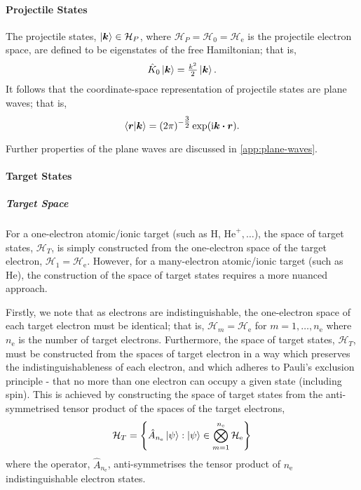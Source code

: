 \documentclass[draft]{article}
\begin{document}
\paragraph{Projectile States}
\label{sec:projectile-states}

The projectile states, $\ket{\boldsymbol{k}} \in \mathcal{H}_{P}$, where
$\mathcal{H}_{P} = \mathcal{H}_{0} = \mathcal{H}_{\mathrm{e}}$ is the projectile
electron space, are defined to be eigenstates of the free Hamiltonian; that is,
\begin{equation}
  \label{eq:projectile-hamiltonian}
  \hat{K}_{0}
  \ket{\boldsymbol{k}}
  =
  \tfrac{k^{2}}{2}
  \ket{\boldsymbol{k}}
  .
\end{equation}
It follows that the coordinate-space representation of projectile states are
plane waves; that is,
\begin{equation}
  \label{eq:projectile-states}
  \bra{\boldsymbol{r}}
  \ket{\boldsymbol{k}}
  =
  \lr{2 \pi}^{-\tfrac{3}{2}}
  \exponential\lr
  {
    \imath
    \boldsymbol{k}
    \vdot
    \boldsymbol{r}
  }
  .
\end{equation}

Further properties of the plane waves are discussed in
\autoref{app:plane-waves}.

\paragraph{Target States}
\label{sec:target-states}

\subparagraph{Target Space}
\label{sec:target-space}

For a one-electron atomic/ionic target (such as H, $\mathrm{He}^{+}, \dotsc$),
the space of target states, $\mathcal{H}_{T}$, is simply constructed from the
one-electron space of the target electron,
$\mathcal{H}_{1} = \mathcal{H}_{\mathrm{e}}$.
However, for a many-electron atomic/ionic target (such as He), the construction
of the space of target states requires a more nuanced approach.

Firstly, we note that as electrons are indistinguishable, the one-electron space
of each target electron must be identical; that is,
$\mathcal{H}_{m} = \mathcal{H}_{\mathrm{e}}$ for
$m = 1, \dotsc, n_{\mathrm{e}}$ where $n_{\mathrm{e}}$ is the number of target
electrons.
Furthermore, the space of target states, $\mathcal{H}_{T}$, must be constructed
from the spaces of target electron in a way which preserves the
indistinguishableness of each electron, and which adheres to Pauli's exclusion
principle - that no more than one electron can occupy a given state (including
spin).
This is achieved by constructing the space of target states from the
anti-symmetrised tensor product of the spaces of the target electrons,
\begin{equation}
  \label{eq:target-space}
  \mathcal{H}_{T}
  =
  \lrset[\Bigg]
  {
    \hat{A}_{n_{\mathrm{e}}}
    \ket{\psi}
    :
    \ket{\psi}
    \in
    \bigotimes_{m = 1}^{n_{\mathrm{e}}}
    \mathcal{H}_{\mathrm{e}}
  }
\end{equation}
where the operator, $\hat{A}_{n_{\mathrm{e}}}$, anti-symmetrises the tensor
product of $n_{\mathrm{e}}$ indistinguishable electron states.
\end{document}

